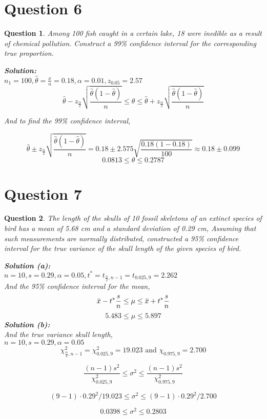 \documentclass{article}
\theoremstyle{questionstyle}
\newtheorem{myquestion}{Question}
\begin{document}
\section{Question 6}
\begin{myquestion}
    Among 100 fish caught in a certain lake, 18 were inedible as a result of chemical pollution. Construct a 99\% confidence interval for the corresponding true proportion.

\textbf{Solution:}\\
\(n_1 = 100, \hat{\theta} = \frac{x}{n} = 0.18, \alpha=0.01, z_{0.05} = 2.57\)
\[\hat{\theta} - z_{\frac{\alpha}{2}}\sqrt{\frac{\hat{\theta}(1-\hat{\theta})}{n}} \leq \theta\leq \hat{\theta} + z_{\frac{\alpha}{2}}\sqrt{\frac{\hat{\theta}(1-\hat{\theta})}{n}}\]

And to find the 99\% confidence interval, 

\[
\hat{\theta} \pm z_{\frac{\alpha}{2}} \sqrt{\frac{\hat{\theta}(1-\hat{\theta})}{n}} = 0.18 \pm 2.575 \sqrt{\frac{0.18(1-0.18)}{100}} \approx 0.18 \pm 0.099
\]
\[0.0813 \leq \theta \leq 0.2787 \]

\end{myquestion}


\section{Question 7}
\begin{myquestion}
    The length of the skulls of 10 fossil skeletons of an extinct species of bird has a mean of 5.68 cm and a standard deviation of 0.29 cm, Assuming that such measurements are normally distributed, constructed a 95\% confidence interval for the true variance of the skull length of the given species of bird.

\textbf{Solution (a):}\\

\(n = 10,s=0.29, \alpha = 0.05, t^{*} = t_{\frac{\alpha}{2},n-1} = t_{0.025,9} = 2.262\)\\
And the 95\% confidence interval for the mean, 
\[ \Bar{x} - t^{*}\frac{s}{n} \leq \mu \leq \Bar{x} + t^{*}\frac{s}{n}\]
\[5.483 \leq \mu \leq 5.897\]
\textbf{Solution (b):}\\
And the true variance skull length,\\
\(n=10, s=0.29, \alpha = 0.05\) 
\[\chi_{\frac{\alpha}{2},n-1}^2 = \chi_{0.025,9}^2 = 19.023 \text{ and } \chi_{0.975,9} = 2.700\]

\[ 
\frac{(n-1)s^2}{\chi_{0.025,9}^2} \leq \sigma^2 \leq \frac{(n-1)s^2}{\chi_{0.975,9}^2}
\]

\[
(9-1) \cdot 0.29^2 / 19.023 \leq \sigma^2 \leq (9-1) \cdot 0.29^2 / 2.700
\]

\[
0.0398 \leq \sigma^2 \leq 0.2803
\]
\end{myquestion}
\end{document}
